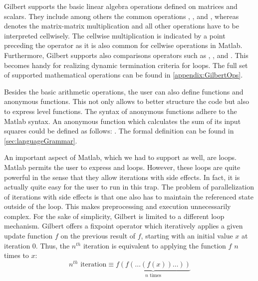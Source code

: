 Gilbert supports the basic linear algebra operations defined on matrices and scalars.
They include among others the common operations \code{+}, \code{-}, \code{/} and \code{*}, whereas \code{*} denotes the matrix-matrix multiplication and all other operations have to be interpreted cellwisely.
The cellwise multiplication is indicated by a point preceding the operator  as it is also common for cellwise operations in Matlab.
Furthermore, Gilbert supports also comparisons operators such as \code{>}, \code{>=}, \code{==} and \code{\textasciitilde=}.
This becomes handy for realizing dynamic termination criteria for loops.
The full set of supported mathematical operations can be found in \cref{appendix:GilbertOps}.

Besides the basic arithmetic operations, the user can also define functions and anonymous functions.
This not only allows to better structure the code but also to express  level functions.
The syntax of anonymous functions adhere to the Matlab syntax.
An anonymous function which calculates the sum of its input squares could be defined as follows: .
The formal definition can be found in \cref{sec:languageGrammar}.

An important aspect of Matlab, which we had to support as well, are loops.
Matlab permits the user to express  and  loops.
However, these loops are quite powerful in the sense that they allow iterations with side effects.
In fact, it is actually quite easy for the user to run in this trap.
The problem of parallelization of iterations with side effects is that one also has to maintain the referenced state outside of the loop.
This makes preprocessing and execution unnecessarily complex.
For the sake of simplicity, Gilbert is limited to a different loop mechanism.
Gilbert offers a fixpoint operator  which iteratively applies a given update function $f$ on the previous result of $f$, starting with an initial value $x$ at iteration $0$.
Thus, the $n^{th}$ iteration is equivalent to applying the function $f$ $n$ times to $x$: 
\begin{displaymath}
	n^{th}\text{ iteration}\equiv\underbrace{f(f(\ldots(f(x))\ldots))}_{\text{$n$ times}}
\end{displaymath}

